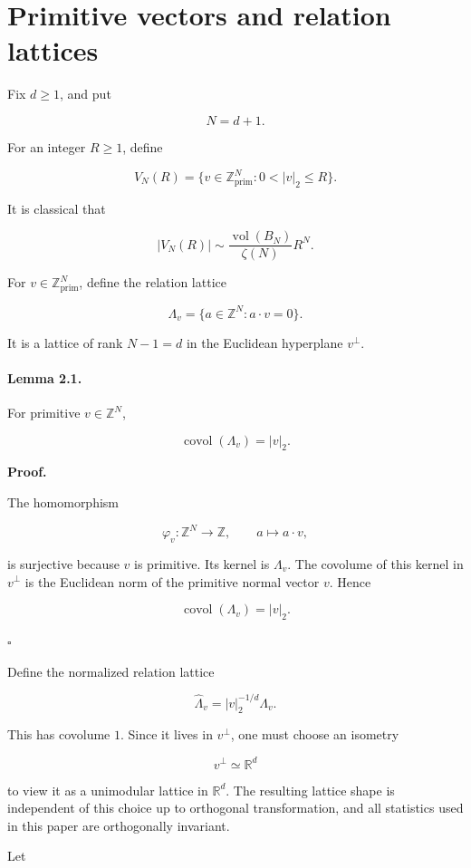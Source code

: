 \documentclass[11pt]{article}
\begin{document}
\section{Primitive vectors and relation lattices}

Fix $d\ge1$, and put

\[
N=d+1.
\]

For an integer $R\ge1$, define

\[
V_N(R)=\{v\in\mathbb Z^N_{\mathrm{prim}}:0<|v|_2\le R\}.
\]

It is classical that

\[
|V_N(R)|\sim \frac{\operatorname{vol}(B_N)}{\zeta(N)}R^N.
\]

For $v\in\mathbb Z^N_{\mathrm{prim}}$, define the relation lattice

\[
\Lambda_v=\{a\in\mathbb Z^N:a\cdot v=0\}.
\]

It is a lattice of rank $N-1=d$ in the Euclidean hyperplane $v^\perp$.

\paragraph{Lemma 2.1.}

For primitive $v\in\mathbb Z^N$,

\[
\operatorname{covol}(\Lambda_v)=|v|_2.
\]

\noindent\textbf{Proof.}

The homomorphism

\[
\varphi_v:\mathbb Z^N\to\mathbb Z,\qquad a\mapsto a\cdot v,
\]

is surjective because $v$ is primitive. Its kernel is $\Lambda_v$. The covolume of this kernel in $v^\perp$ is the Euclidean norm of the primitive normal vector $v$. Hence

\[
\operatorname{covol}(\Lambda_v)=|v|_2.
\]

$\square$

Define the normalized relation lattice

\[
\widehat\Lambda_v=|v|_2^{-1/d}\Lambda_v.
\]

This has covolume $1$. Since it lives in $v^\perp$, one must choose an isometry

\[
v^\perp\simeq\mathbb R^d
\]

to view it as a unimodular lattice in $\mathbb R^d$. The resulting lattice shape is independent of this choice up to orthogonal transformation, and all statistics used in this paper are orthogonally invariant.

Let
\end{document}
